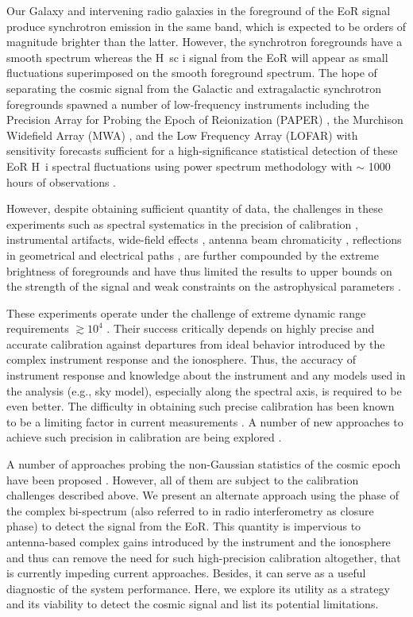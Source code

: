 \documentclass[
reprint,
superscriptaddress,
amsmath,
amssymb,
aps,
prd
]{revtex4-1}
\begin{document}
Our Galaxy and intervening radio galaxies in the foreground of the EoR signal produce synchrotron emission in the same band, which is expected to be orders of magnitude brighter than the latter. However, the synchrotron foregrounds have a smooth spectrum whereas the H~{sc i} signal from the EoR will appear as small fluctuations superimposed on the smooth foreground spectrum. The hope of separating the cosmic signal from the Galactic and extragalactic synchrotron foregrounds spawned a number of low-frequency instruments including the Precision Array for Probing the Epoch of Reionization (PAPER) \cite{par10}, the Murchison Widefield Array (MWA) \cite{tin13}, and the Low Frequency Array (LOFAR) \cite{van13} with sensitivity forecasts sufficient for a high-significance statistical detection of these EoR H~{\sc i} spectral fluctuations using power spectrum methodology with $\sim$ 1000 hours of observations \cite{bea13,thy13}. 

However, despite obtaining sufficient quantity of data, the challenges in these experiments such as spectral systematics in the precision of calibration \cite{barry16}, instrumental artifacts, wide-field effects \cite{thy15a,thy15b}, antenna beam chromaticity \cite{thy16}, reflections in geometrical and electrical paths \cite{thy16}, are further compounded by the extreme brightness of foregrounds and have thus limited the results to upper bounds on the strength of the signal \cite{pac13,ali15,patil17} and weak constraints on the astrophysical parameters \cite{pob15}. 

These experiments operate under the challenge of extreme dynamic range requirements $\gtrsim 10^4$ \cite{dim02,ali08,ber09,ber10,dat10,gho12}. Their success critically depends on highly precise and accurate calibration against departures from ideal behavior introduced by the complex instrument response and the ionosphere. Thus, the accuracy of instrument response and knowledge about the instrument and any models used in the analysis (e.g., sky model), especially along the spectral axis, is required to be even better. The difficulty in obtaining such precise calibration \cite[for e.g.,][]{barry16,tro16} has been known to be a limiting factor in current measurements \cite{ali15,patil16,patil17}. A number of new approaches to achieve such precision in calibration are being explored \cite{liu10,zhe14,sie17,dil17}.

A number of approaches probing the non-Gaussian statistics of the cosmic epoch have been proposed \cite{lid07,bar08,harker09,wat14,kit16,ali06,son15,shi16,maj17}. However, all of them are subject to the calibration challenges described above. We present an alternate approach using the phase of the complex bi-spectrum (also referred to in radio interferometry as closure phase) to detect the signal from the EoR. This quantity is impervious to antenna-based complex gains introduced by the instrument and the ionosphere and thus can remove the need for such high-precision calibration altogether, that is currently impeding current approaches. Besides, it can serve as a useful diagnostic of the system performance. Here, we explore its utility as a strategy and its viability to detect the cosmic signal and list its potential limitations.
\end{document}
